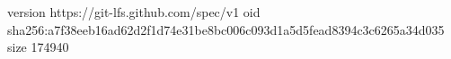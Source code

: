 version https://git-lfs.github.com/spec/v1
oid sha256:a7f38eeb16ad62d2f1d74e31be8bc006c093d1a5d5fead8394c3c6265a34d035
size 174940
